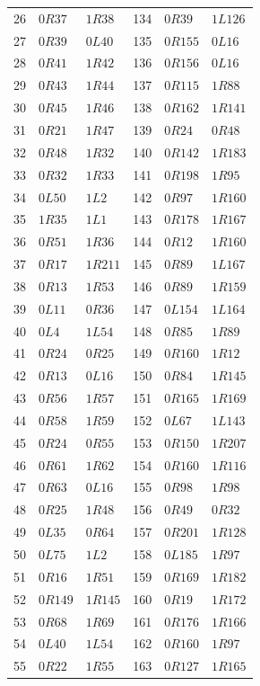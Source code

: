 \begin{longtable}{rll@{\qquad}rll}
26 & $0R37$ & $1R38$ & 134 & $0R39$ & $1L126$\\
27 & $0R39$ & $0L40$ & 135 & $0R155$ & $0L16$\\
28 & $0R41$ & $1R42$ & 136 & $0R156$ & $0L16$\\
29 & $0R43$ & $1R44$ & 137 & $0R115$ & $1R88$\\
30 & $0R45$ & $1R46$ & 138 & $0R162$ & $1R141$\\
31 & $0R21$ & $1R47$ & 139 & $0R24$ & $0R48$\\
32 & $0R48$ & $1R32$ & 140 & $0R142$ & $1R183$\\
33 & $0R32$ & $1R33$ & 141 & $0R198$ & $1R95$\\
34 & $0L50$ & $1L2$ & 142 & $0R97$ & $1R160$\\
35 & $1R35$ & $1L1$ & 143 & $0R178$ & $1R167$\\
36 & $0R51$ & $1R36$ & 144 & $0R12$ & $1R160$\\
37 & $0R17$ & $1R211$ & 145 & $0R89$ & $1L167$\\
38 & $0R13$ & $1R53$ & 146 & $0R89$ & $1R159$\\
39 & $0L11$ & $0R36$ & 147 & $0L154$ & $1L164$\\
40 & $0L4$ & $1L54$ & 148 & $0R85$ & $1R89$\\
41 & $0R24$ & $0R25$ & 149 & $0R160$ & $1R12$\\
42 & $0R13$ & $0L16$ & 150 & $0R84$ & $1R145$\\
43 & $0R56$ & $1R57$ & 151 & $0R165$ & $1R169$\\
44 & $0R58$ & $1R59$ & 152 & $0L67$ & $1L143$\\
45 & $0R24$ & $0R55$ & 153 & $0R150$ & $1R207$\\
46 & $0R61$ & $1R62$ & 154 & $0R160$ & $1R116$\\
47 & $0R63$ & $0L16$ & 155 & $0R98$ & $1R98$\\
48 & $0R25$ & $1R48$ & 156 & $0R49$ & $0R32$\\
49 & $0L35$ & $0R64$ & 157 & $0R201$ & $1R128$\\
50 & $0L75$ & $1L2$ & 158 & $0L185$ & $1R97$\\
51 & $0R16$ & $1R51$ & 159 & $0R169$ & $1R182$\\
52 & $0R149$ & $1R145$ & 160 & $0R19$ & $1R172$\\
53 & $0R68$ & $1R69$ & 161 & $0R176$ & $1R166$\\
54 & $0L40$ & $1L54$ & 162 & $0R160$ & $1R97$\\
55 & $0R22$ & $1R55$ & 163 & $0R127$ & $1R165$\\

\end{longtable}
